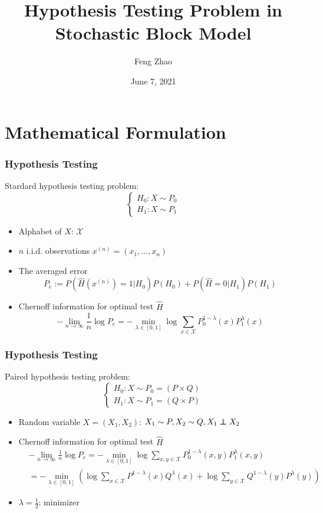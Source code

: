 \documentclass{beamer}
\title{Hypothesis Testing Problem in Stochastic Block Model}
\author{Feng Zhao}
\date{June 7, 2021}
\newcommand\independent{\protect\mathpalette{\protect\independenT}{\perp}}
\def\independenT#1#2{\mathrel{\rlap{$#1#2$}\mkern2mu{#1#2}}}
\begin{document}
\begin{frame}
	\titlepage
\end{frame}

\section{Mathematical Formulation}
\begin{frame}
\frametitle{Hypothesis Testing}
Stardard hypothesis testing problem:
\begin{equation}
\begin{cases}
H_0: X \sim P_0 \\
H_1: X \sim P_1
\end{cases}
\end{equation}
\begin{itemize}
\item Alphabet of $X$: $\mathcal{X}$
\item $n$ i.i.d. observations $x^{(n)}=(x_1, \dots, x_n)$
\item The averaged error
$$
P_e := P(\widehat{H}(x^{(n)})=1|H_0)P(H_0) + P(\widehat{H}=0|H_1)P(H_1)
$$
\item Chernoff information for optimal test $\widehat{H}$
\begin{equation}
-\lim_{n\to\infty} \frac{1}{n}\log P_e = -\min_{\lambda \in [0,1]}
\log \sum_{x\in \mathcal{X}}
P^{1-\lambda}_0(x) P^{\lambda}_1(x) 
\end{equation}
\end{itemize}
\end{frame}
\begin{frame}\frametitle{Hypothesis Testing}
Paired hypothesis testing problem:
\begin{equation*}
\begin{cases}
H_0: X \sim P_0=(P \times Q)\\
H_1: X \sim P_1=(Q \times P)
\end{cases}
\end{equation*}
\begin{itemize}
\item Random variable $X=(X_1, X_2)$: $X_1 \sim P, X_2 \sim Q, X_1 \independent X_2$
\item Chernoff information for optimal test $\widehat{H}$
\begin{align*}
&-\lim_{n\to\infty} \frac{1}{n}\log P_e = -\min_{\lambda \in [0,1]}
\log \sum_{x,y\in \mathcal{X}}
P^{1-\lambda}_0(x,y) P^{\lambda}_1(x,y)  \\
&= -\min_{\lambda \in [0,1]}
\left(\log \sum_{x\in \mathcal{X}}
P^{1-\lambda}(x) Q^{\lambda}(x) 
+\log \sum_{y\in \mathcal{X}}
Q^{1-\lambda}(y) P^{\lambda}(y) 
\right)
\end{align*}
\item $\lambda=\frac{1}{2}$: minimizer
\end{itemize}
\end{frame}
\end{document}
